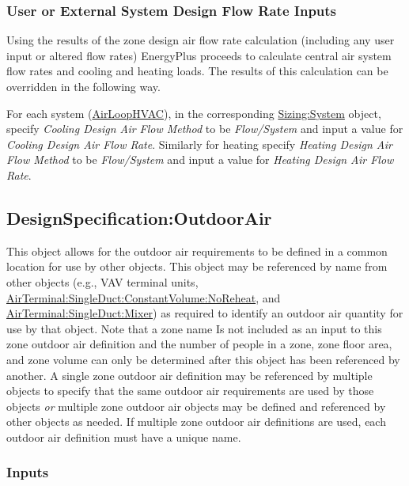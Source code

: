 \subsubsection{User or External System Design Flow Rate Inputs}\label{user-or-external-system-design-flow-rate-inputs}

Using the results of the zone design air flow rate calculation (including any user input or altered flow rates) EnergyPlus proceeds to calculate central air system flow rates and cooling and heating loads. The results of this calculation can be overridden in the following way.

For each system (\hyperref[airloophvac]{AirLoopHVAC}), in the corresponding \hyperref[sizingsystem]{Sizing:System} object, specify \emph{Cooling Design Air Flow Method} to be \emph{Flow/System} and input a value for \emph{Cooling Design Air Flow Rate}. Similarly for heating specify \emph{Heating Design Air Flow Method} to be \emph{Flow/System} and input a value for \emph{Heating Design Air Flow Rate}.

\subsection{DesignSpecification:OutdoorAir}\label{designspecificationoutdoorair}

This object allows for the outdoor air requirements to be defined in a common location for use by other objects. This object may be referenced by name from other objects (e.g., VAV terminal units, \hyperref[airterminalsingleductconstantvolumenoreheat]{AirTerminal:SingleDuct:ConstantVolume:NoReheat}, and \hyperref[airterminalsingleductmixer]{AirTerminal:SingleDuct:Mixer}) as required to identify an outdoor air quantity for use by that object. Note that a zone name Is not included as an input to this zone outdoor air definition and the number of people in a zone, zone floor area, and zone volume can only be determined after this object has been referenced by another. A single zone outdoor air definition may be referenced by multiple objects to specify that the same outdoor air requirements are used by those objects \emph{or} multiple zone outdoor air objects may be defined and referenced by other objects as needed. If multiple zone outdoor air definitions are used, each outdoor air definition must have a unique name.

\subsubsection{Inputs}\label{inputs-012}

